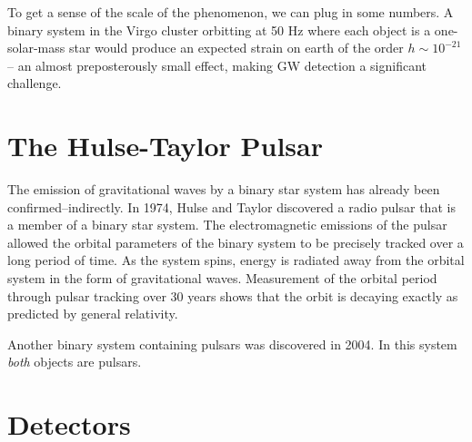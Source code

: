 To get a sense of the scale of the phenomenon, we can plug in some
numbers.  A binary system in the Virgo cluster orbitting at 50 Hz
where each object is a one-solar-mass star would produce an expected
strain on earth of the order $h\sim10^{-21}$-- an almost
preposterously small effect, making GW detection a significant
challenge.

\section{The Hulse-Taylor Pulsar}

The emission of gravitational waves by a binary star system has
already been confirmed--indirectly.  In 1974, Hulse and Taylor
discovered a radio pulsar that is a member of a binary star
system\cite{Hulse1975Discovery,Weisberg2005Relativistic}.  The
electromagnetic emissions of the pulsar allowed the orbital parameters
of the binary system to be precisely tracked over a long period of
time.  As the system spins, energy is radiated away from the orbital
system in the form of gravitational waves. Measurement of the orbital
period through pulsar tracking over 30 years shows that the orbit is
decaying exactly as predicted by general relativity.

Another binary system containing pulsars was discovered in 2004.  In
this system \emph{both} objects are
pulsars\cite{Lyne2004DoublePulsar,Kramer2006Tests}.

\section{Detectors}

